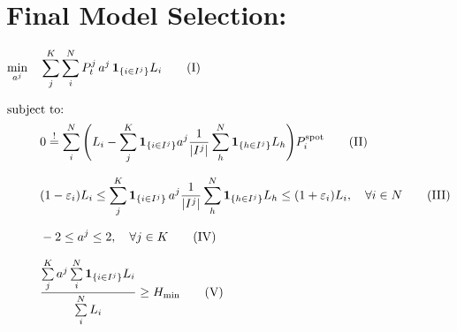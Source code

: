 \documentclass[11pt,leqno]{article}
\begin{document}
\section*{Final Model Selection:}
\begin{align} 
\min_{a^{j}} \quad & \sum_{j}^{K}\sum_{i}^{N} P_t^{j} \, a^{j} \, \mathbf{1}_{\{i \in I^{j}\}} L_i \tag{I}\\[0.7em]
\intertext{subject to:}
& 0 \mathrel{\stackrel{!}{=}} \sum_{i}^{N}\Bigg(L_i - \sum_{j}^{K} \mathbf{1}_{\{i \in I^{j}\}} a^{j}
  \frac{1}{|I^{j}|} \sum_{h}^{N} \mathbf{1}_{\{h \in I^{j}\}} L_h\Bigg)P_i^{\text{spot}} \tag{II}\\[0.7em]
& (1-\varepsilon_i)L_i \le \sum_{j}^{K} \mathbf{1}_{\{i \in I^{j}\}} \, a^{j} \frac{1}{|I^{j}|}
  \sum_{h}^{N} \mathbf{1}_{\{h \in I^{j}\}} L_h \le (1+\varepsilon_i)L_i,\quad \forall i \in N \tag{III}\\[0.7em]
& -2 \le a^{j} \le 2,\quad \forall j \in K \tag{IV}\\[0.7em]
& \dfrac{\sum\limits_{j}^{K} a^{j} \sum\limits_{i}^{N} \mathbf{1}_{\{i \in I^{j}\}} L_i}{\sum\limits_{i}^{N} L_i} \ge H_{\min} \tag{V}
\end{align}
\end{document}
